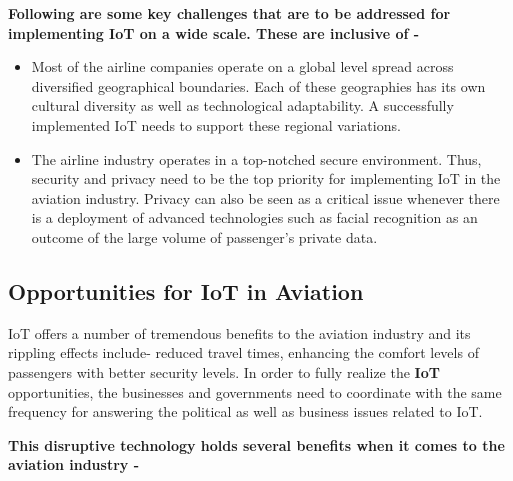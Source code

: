 \documentclass[a4paper,12pt]{book}
\begin{document}
\textbf{Following are some key challenges that are to be addressed for implementing IoT on a wide scale. These are inclusive of -}

\begin{itemize}
\item{ Most of the airline companies operate on a global level spread across diversified geographical boundaries. Each of these geographies has its own cultural diversity as well as technological adaptability. A successfully implemented IoT needs to support these regional variations.}
\item{ The airline industry operates in a top-notched secure environment. Thus, security and privacy need to be the top priority for implementing IoT in the aviation industry. Privacy can also be seen as a critical issue whenever there is a deployment of advanced technologies such as facial recognition as an outcome of the large volume of passenger’s private data.}
\end{itemize}

\subsection{Opportunities for IoT in Aviation}

IoT offers a number of tremendous benefits to the aviation industry and its rippling effects include- reduced travel times, enhancing the comfort levels of passengers with better security levels. In order to fully realize the \textbf{IoT} opportunities, the businesses and governments need to coordinate with the same frequency for answering the political as well as business issues related to IoT.

\noindent \textbf{This disruptive technology holds several benefits when it comes to the aviation industry -}
\end{document}
